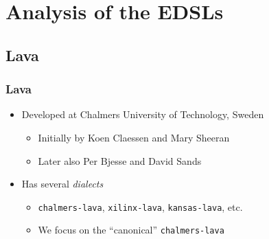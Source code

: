 \documentclass{beamer}
\begin{document}
    \section{Analysis of the EDSLs}
    \label{sec:analysis-of-the-edsls}
        \frame{\sectionpage}

        \subsection{Lava}
        \label{subsec:lava}
            \begin{frame}
                \frametitle{Lava}

                \begin{itemize}
                    \item Developed at Chalmers University of Technology, Sweden
                        \begin{itemize}
                            \item Initially by Koen Claessen and Mary Sheeran
                            \item Later also Per Bjesse and David Sands
                        \end{itemize}

                    \item Has several \emph{dialects}
                        \begin{itemize}
                            \item \texttt{chalmers-lava}, \texttt{xilinx-lava}, \texttt{kansas-lava}, etc. 
                            \item We focus on the ``canonical'' \texttt{chalmers-lava}
                        \end{itemize}
                \end{itemize}
            \end{frame}
\end{document}
